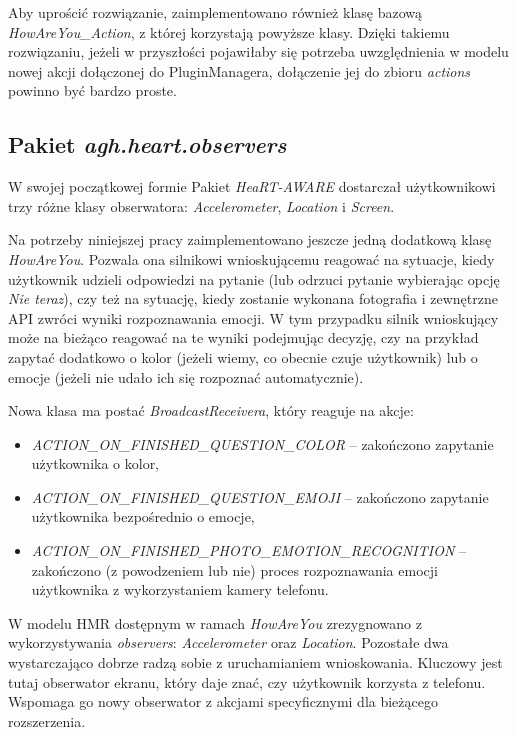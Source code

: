 Aby uprościć rozwiązanie, zaimplementowano również klasę bazową \textit{HowAreYou\_Action}, z której korzystają powyższe klasy. Dzięki takiemu rozwiązaniu, jeżeli w przyszłości pojawiłaby się potrzeba uwzględnienia w modelu nowej akcji dołączonej do PluginManagera, dołączenie jej do zbioru \textit{actions} powinno być bardzo proste.


\subsection{Pakiet \textit{agh.heart.observers}}

W swojej początkowej formie Pakiet \textit{HeaRT-AWARE} dostarczał użytkownikowi trzy różne klasy obserwatora: \textit{Accelerometer}, \textit{Location} i \textit{Screen}. 

Na potrzeby niniejszej pracy zaimplementowano jeszcze jedną dodatkową klasę \textit{HowAreYou}. Pozwala ona silnikowi wnioskującemu reagować na sytuacje, kiedy użytkownik udzieli odpowiedzi na pytanie (lub odrzuci pytanie wybierając opcję \textit{Nie teraz}), czy też na sytuację, kiedy zostanie wykonana fotografia i zewnętrzne API zwróci wyniki rozpoznawania emocji. W tym przypadku silnik wnioskujący może na bieżąco reagować na te wyniki podejmując decyzję, czy na przykład zapytać dodatkowo o kolor (jeżeli wiemy, co obecnie czuje użytkownik) lub o emocje (jeżeli nie udało ich się rozpoznać automatycznie). 

Nowa klasa ma postać \textit{BroadcastReceivera}, który reaguje na akcje:
\begin{itemize}
\item \textit{ACTION\_ON\_FINISHED\_QUESTION\_COLOR} -- zakończono zapytanie użytkownika o kolor,
\item \textit{ACTION\_ON\_FINISHED\_QUESTION\_EMOJI} -- zakończono zapytanie użytkownika bezpośrednio o emocje,
\item \textit{ACTION\_ON\_FINISHED\_PHOTO\_EMOTION\_RECOGNITION} -- zakończono (z powodzeniem lub nie) proces rozpoznawania emocji użytkownika z wykorzystaniem kamery telefonu.
\end{itemize}

W modelu HMR dostępnym w ramach \textit{HowAreYou} zrezygnowano z wykorzystywania \textit{observers}: \textit{Accelerometer} oraz \textit{Location}. Pozostałe dwa wystarczająco dobrze radzą sobie z uruchamianiem wnioskowania. Kluczowy jest tutaj obserwator ekranu, który daje znać, czy użytkownik korzysta z telefonu. Wspomaga go nowy obserwator z akcjami specyficznymi dla bieżącego rozszerzenia. 

